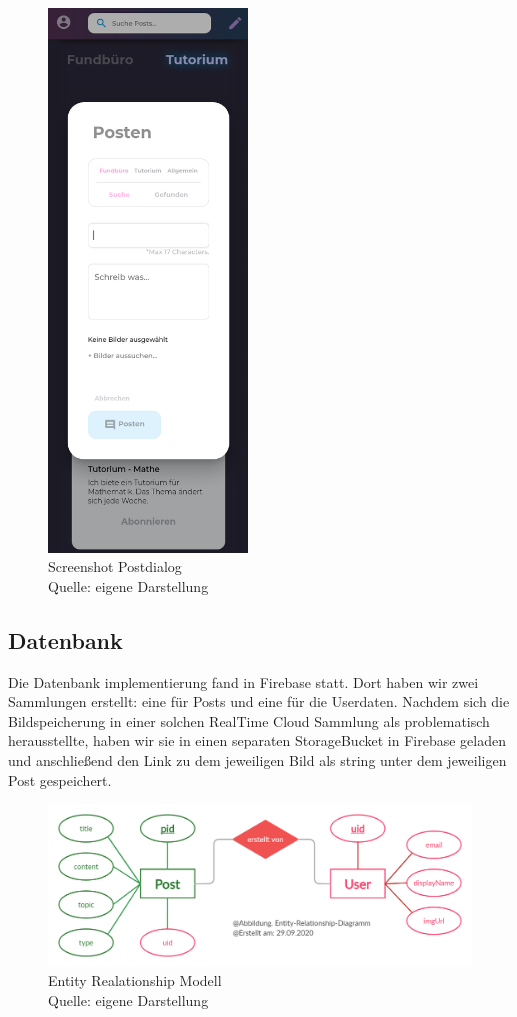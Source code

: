 \documentclass[12pt,titlepage]{article}
\begin{document}
\begin{figure}[hbt!]
\centering
\includegraphics[width=150pt]{screenshots/Screenshot_Mobil_Posten.png}
\caption[Sreenshot Postdialog]{Screenshot Postdialog\\Quelle: eigene Darstellung}
\end{figure}

\FloatBarrier

\subsection{Datenbank}

Die Datenbank implementierung fand in Firebase statt. Dort haben wir zwei Sammlungen erstellt: eine für Posts und eine für die Userdaten. 
Nachdem sich die Bildspeicherung in einer solchen RealTime Cloud Sammlung als problematisch herausstellte, haben wir sie in einen separaten StorageBucket in Firebase geladen und anschließend den Link zu dem jeweiligen Bild als string unter dem jeweiligen Post gespeichert. 

\begin{figure}[!htb]
\centering
\includegraphics[width=400pt]{abbildungen/Abbildung_ERM.png}
\caption[ERM]{Entity Realationship Modell \\Quelle: eigene Darstellung}
\end{figure}
\end{document}
